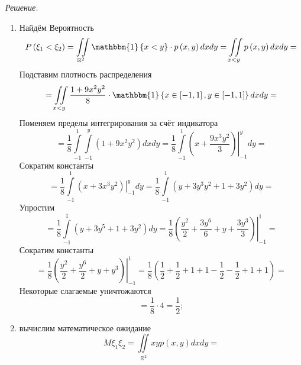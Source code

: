 \textit{Решение.}
\begin{enumerate}[label=\alph*)]
  \item Найдём Вероятность
  \begin{equation*}
    P \left( \xi_1 < \xi_2 \right) =
    \iint \limits_{ \mathbb{R}^2}
      \mathbbm{1} \left\{ x < y \right\} \cdot p \left( x, y \right)
    dxdy =
    \iint \limits_{x < y} p \left( x, y \right) dxdy =
  \end{equation*}
  Подставим плотность распределения
  \begin{equation*}
    = \iint \limits_{x < y}
      \frac{1 + 9x^2 y^2}{8} \cdot
      \mathbbm{1} \left\{
        x \in \left[ -1, 1 \right], y \in \left[ -1, 1 \right]
      \right\}
    dxdy =
  \end{equation*}
  Поменяем пределы интегрирования за счёт индикатора
  \begin{equation*}
    = \frac{1}{8}
    \int \limits_{-1}^1 \int \limits_{-1}^y \left( 1 + 9x^2 y^2 \right) dxdy =
    \frac{1}{8} \int \limits_{-1}^1
      \left. \left( x + \frac{9x^3 y^2}{3} \right) \right|_{-1}^y
    dy =
  \end{equation*}
  Сократим константы
  \begin{equation*}
    = \frac{1}{8}
    \int \limits_{-1}^1 \left. \left(x + 3x^3 y^2 \right) \right|_{-1}^y dy =
    \frac{1}{8} \int \limits_{-1}^1 \left( y + 3y^3 y^2 + 1 + 3y^2 \right) dy =
  \end{equation*}
  Упростим
  \begin{equation*}
    = \frac{1}{8} \int \limits_{-1}^1 \left( y + 3y^5 + 1 + 3y^2 \right) dy =
    \frac{1}{8} \left.
      \left( \frac{y^2}{2} + \frac{3y^6}{6} + y + \frac{3y^3}{3} \right)
    \right|_{-1}^1 =
  \end{equation*}
  Сократим константы
  \begin{equation*}
    = \frac{1}{8} \left.
      \left( \frac{y^2}{2} + \frac{y^6}{2} + y + y^3 \right)
    \right|_{-1}^1 =
    \frac{1}{8} \left(
      \frac{1}{2} + \frac{1}{2} + 1 + 1 - \frac{1}{2} - \frac{1}{2} + 1 + 1
    \right) =
  \end{equation*}
  Некоторые слагаемые уничтожаются
  \begin{equation*}
    = \frac{1}{8} \cdot 4 =
    \frac{1}{2};
  \end{equation*}
  \item вычислим математическое ожидание
  \begin{equation*}
    M \xi_1 \xi_2 =
    \iint \limits_{ \mathbb{R}^2} xyp \left( x, y \right) dxdy =

\end{equation*}
\end{enumerate}
